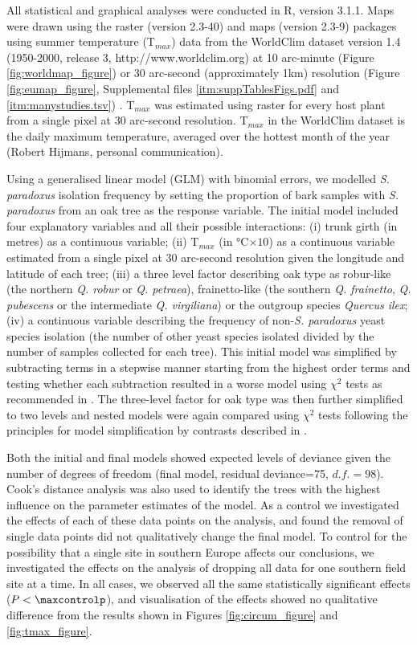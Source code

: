 \documentclass[12pt]{article}
\begin{document}
\begin{linenumbers}
All statistical and graphical analyses were conducted in R, version 3.1.1. Maps were drawn using the raster (version 2.3-40) and maps (version 2.3-9) packages using summer temperature (T$_{max}$) data from the WorldClim dataset version 1.4 (1950-2000, release 3, http://www.worldclim.org) at 10 arc-minute (Figure \ref{fig:worldmap_figure}) or 30 arc-second (approximately 1km) resolution (Figure \ref{fig:eumap_figure}, Supplemental files \ref{itm:suppTablesFigs.pdf} and \ref{itm:manystudies.tsv}) \citep{hijmans_very_2005}. T$_{max}$ was estimated using raster for every host plant from a single pixel at 30 arc-second resolution. T$_{max}$ in the WorldClim dataset is the daily maximum temperature, averaged over the hottest month of the year (Robert Hijmans, personal communication).

Using a generalised linear model (GLM) with binomial errors, we modelled \textit{S. paradoxus} isolation frequency by setting the proportion of bark samples with \textit{S. paradoxus} from an oak tree as the response variable. The initial model included four explanatory variables and all their possible interactions: (i) trunk girth (in metres) as a continuous variable; (ii) T$_{max}$ (in \si{\degreeCelsius}$\times10$) as a continuous variable estimated from a single pixel at 30 arc-second resolution given the longitude and latitude of each tree; (iii) a three level factor describing oak type as robur-like (the northern \textit{Q. robur} or \textit{Q. petraea}), frainetto-like (the southern \textit{Q. frainetto}, \textit{Q. pubescens} or the intermediate \textit{Q. virgiliana}) or the outgroup species \textit{Quercus ilex}; (iv) a continuous variable describing the frequency of non-\textit{S. paradoxus} yeast species isolation (the number of other yeast species isolated divided by the number of samples collected for each tree). This initial model was simplified by subtracting terms in a stepwise manner starting from the highest order terms and testing whether each subtraction resulted in a worse model using $\chi^2$ tests as recommended in \citet{crawley_statistics:_2005}. The three-level factor for oak type was then further simplified to two levels and nested models were again compared using $\chi^2$ tests following the principles for model simplification by contrasts described in \citet{crawley_statistics:_2005}.

Both the initial and final models showed expected levels of deviance given the number of degrees of freedom (final model, residual deviance=75, $d.f.=98$). Cook's distance analysis was also used to identify the trees with the highest influence on the parameter estimates of the model. As a control we investigated the effects of each of these data points on the analysis, and found the removal of single data points did not qualitatively change the final model. To control for the possibility that a single site in southern Europe affects our conclusions, we investigated the effects on the analysis of dropping all data for one southern field site at a time. In all cases, we observed all the same statistically significant effects ($P<\maxcontrolp$), and visualisation of the effects showed no qualitative difference from the results shown in Figures \ref{fig:circum_figure} and \ref{fig:tmax_figure}.


\end{linenumbers}
\end{document}
